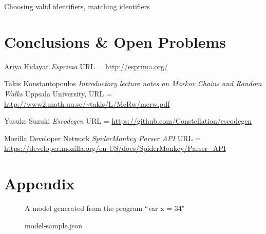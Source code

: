 \documentclass{article}
\begin{document}
Choosing valid identifiers, matching identifiers

\section{Conclusions \& Open Problems}

\clearpage
\begin{thebibliography}{1}

	 Ariya Hidayat {\em Esprima}
		URL = \url{http://esprima.org/}

	 Takis Konstantopoulos {\em Introductory lecture notes on
		Markov Chains and Random Walks} Uppsala University,
		URL = \url{http://www2.math.uu.se/~takis/L/McRw/mcrw.pdf}

	 Yusuke Suzuki {\em Escodegen}
		URL = \url{https://github.com/Constellation/escodegen}

	 Mozilla Developer Network {\em SpiderMonkey Parser API}
		URL = \url{https://developer.mozilla.org/en-US/docs/SpiderMonkey/Parser_API}

\end{thebibliography}

\clearpage
\section*{Appendix}

\begin{figure}[h!]
	\caption{model-sample.json}
	\centering
	A model generated from the program ``var x = 34"
\end{figure}


\end{document}
